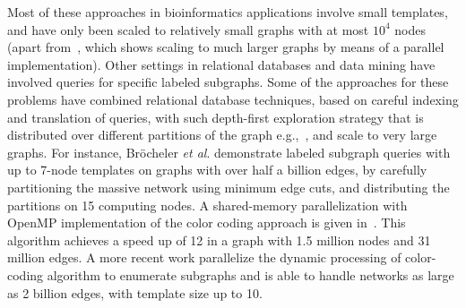 Most of these approaches in bioinformatics applications involve small templates,
and have only been scaled to relatively small graphs with at most $10^4$ nodes
(apart from~\cite{zhao2010subgraph}, which shows scaling to much larger graphs
by means of a parallel implementation). Other settings in relational databases
and data mining have involved queries for specific labeled subgraphs. Some of
the approaches for these problems have combined relational database techniques,
based on careful indexing and translation of queries, with such depth-first
exploration strategy that is distributed over different partitions of the graph
e.g.,~\cite{sakr2009graphrel, ronen2009evaluating, brocheler2010cosi}, and scale
to very large graphs.  For instance, Br\"{o}cheler \emph{et al}.
\cite{brocheler2010cosi} demonstrate labeled subgraph queries with up to 7-node
templates on graphs with over half a billion edges, by carefully partitioning
the massive network using minimum edge cuts, and distributing the partitions on
15 computing nodes. A shared-memory parallelization with OpenMP implementation
of the color coding approach is given in~\cite{slota2013fast}. This algorithm
achieves a speed up of 12 in a graph with 1.5 million nodes and 31 million
edges. A more recent work \cite{slota2015parallel} parallelize the dynamic
processing of color-coding algorithm to enumerate subgraphs and is able to
handle networks as large as 2 billion edges, with template size up to 10.   


